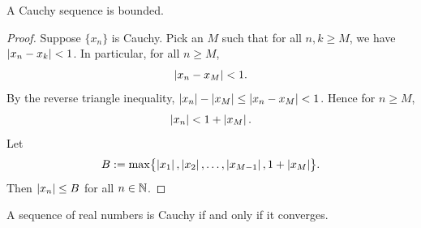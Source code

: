 \begin{prop}
A Cauchy sequence is bounded.
\end{prop}

\begin{proof}
Suppose $\{ x_n \}$ is Cauchy.  Pick an $M$ such that for all
$n,k \geq M$, we have $\left\lvert {x_n-x_k} \right\rvert < 1$.  In particular, 
for all $n \geq M$,
\begin{equation*}
\left\lvert {x_n - x_M} \right\rvert < 1 .
\end{equation*}
By the reverse triangle inequality,
$\left\lvert {x_n} \right\rvert - \left\lvert {x_M} \right\rvert \leq \left\lvert {x_n - x_M} \right\rvert < 1$.  Hence for $n \geq M$,
\begin{equation*}
\left\lvert {x_n} \right\rvert < 1 + \left\lvert {x_M} \right\rvert.
\end{equation*}
Let
\begin{equation*}
B := \max \bigl\{ \left\lvert {x_1} \right\rvert, \left\lvert {x_2} \right\rvert, \ldots, \left\lvert {x_{M-1}} \right\rvert, 1+ \left\lvert {x_M} \right\rvert \bigr\} .
\end{equation*}
Then $\left\lvert {x_n} \right\rvert \leq B$ for all $n \in {\mathbb{N}}$.
\end{proof}

\begin{thm}
A sequence of real numbers is Cauchy if and only if it converges.
\end{thm}

